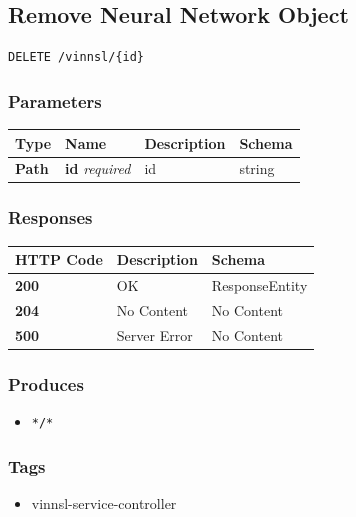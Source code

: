 \subsection{Remove Neural Network
Object}\label{remove-neural-network-object}

\begin{verbatim}
DELETE /vinnsl/{id}
\end{verbatim}

\subsubsection{Parameters}\label{parameters-3}

\begin{longtable}[]{@{}llll@{}}
\toprule
Type & Name & Description & Schema\tabularnewline
\midrule
\endhead
\textbf{Path} & \textbf{id} \emph{required} & id & string\tabularnewline
\bottomrule
\end{longtable}

\subsubsection{Responses}\label{responses-4}

\begin{longtable}[]{@{}lll@{}}
\toprule
HTTP Code & Description & Schema\tabularnewline
\midrule
\endhead
\textbf{200} & OK & ResponseEntity\tabularnewline
\textbf{204} & No Content & No Content\tabularnewline
\textbf{500} & Server Error & No Content\tabularnewline
\bottomrule
\end{longtable}

\subsubsection{Produces}\label{produces-4}

\begin{itemize}
\tightlist
\item
  \texttt{*/*}
\end{itemize}

\subsubsection{Tags}\label{tags-4}

\begin{itemize}
\tightlist
\item
  vinnsl-service-controller
\end{itemize}

